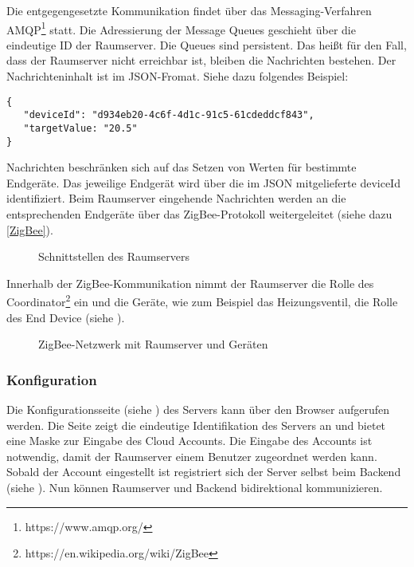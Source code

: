 Die entgegengesetzte Kommunikation findet über das Messaging-Verfahren AMQP\footnote{https://www.amqp.org/} statt. Die Adressierung der Message Queues geschieht über die eindeutige ID der Raumserver. Die Queues sind persistent. Das heißt für den Fall, dass der Raumserver nicht erreichbar ist, bleiben die Nachrichten bestehen. Der Nachrichteninhalt ist im JSON-Fromat. Siehe dazu folgendes Beispiel:
\vspace{2em}
\begin{lstlisting}
{
   "deviceId": "d934eb20-4c6f-4d1c-91c5-61cdeddcf843",
   "targetValue: "20.5"
}

\end{lstlisting}
\vspace{2em}
Nachrichten beschränken sich auf das Setzen von Werten für bestimmte Endgeräte. Das jeweilige Endgerät wird über die im JSON mitgelieferte deviceId identifiziert. Beim Raumserver eingehende Nachrichten werden an die entsprechenden Endgeräte über das ZigBee-Protokoll weitergeleitet (siehe dazu \autoref{ZigBee}). 

\begin{figure}[H]
\centering
{}
\caption{Schnittstellen des Raumservers}
\label{fig:RSSS}
\end{figure}

Innerhalb der ZigBee-Kommunikation nimmt der Raumserver die Rolle des Coordinator\footnote{https://en.wikipedia.org/wiki/ZigBee} ein und die Geräte, wie zum Beispiel das Heizungsventil, die Rolle des End Device (siehe ).

\begin{figure}[H]
\centering
{}
\caption{ZigBee-Netzwerk mit Raumserver und Geräten}
\label{fig:CBRSED}
\end{figure}

\subsubsection{Konfiguration}\label{RoomConfig}
Die Konfigurationsseite (siehe ) des Servers kann über den Browser aufgerufen werden. Die Seite zeigt die eindeutige Identifikation des Servers an und bietet eine Maske zur Eingabe des Cloud Accounts. Die Eingabe des Accounts ist notwendig, damit der Raumserver einem Benutzer zugeordnet werden kann. Sobald der Account eingestellt ist registriert sich der Server selbst beim Backend (siehe ). Nun können Raumserver und Backend bidirektional kommunizieren.








